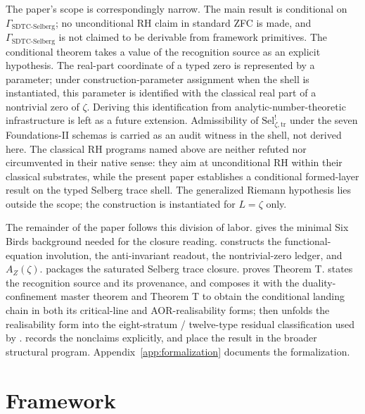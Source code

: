 \documentclass[11pt]{article}
\newcommand{\AZ}{A_{Z}(\zeta)}
\newcommand{\Sel}{\mathrm{Sel}^{!}_{\zeta,\mathrm{tr}}}
\newcommand{\GamSDTCSelberg}{\Gamma_{\mathrm{SDTC\text{-}Selberg}}}
\theoremstyle{definition}
\begin{document}
The paper's scope is correspondingly narrow.  The main result is
conditional on \(\GamSDTCSelberg\); no unconditional RH claim in standard
ZFC is made, and \(\GamSDTCSelberg\) is not claimed to be derivable
from framework primitives.  The conditional theorem takes a value of
the recognition source as an explicit hypothesis.  The
real-part coordinate of a typed zero is represented by a parameter;
under construction-parameter assignment when the shell is
instantiated, this parameter is identified with the classical real
part of a nontrivial zero of \(\zeta\).  Deriving this identification
from analytic-number-theoretic infrastructure is left as a future extension.
Admissibility of \(\Sel\) under the seven Foundations-II schemas is
carried as an audit witness in the shell, not derived here.  The
classical RH programs named above are neither refuted nor
circumvented in their native sense: they aim at unconditional RH
within their classical substrates, while the present paper
establishes a conditional formed-layer result on the typed Selberg
trace shell.  The generalized Riemann hypothesis lies outside the
scope; the construction is instantiated for \(L=\zeta\) only.

The remainder of the paper follows this division of labor.
 gives the minimal Six Birds background needed for
the closure reading.   constructs the
functional-equation involution, the anti-invariant readout, the
nontrivial-zero ledger, and \(\AZ\).  
packages the saturated Selberg trace closure.  
proves Theorem T.   states the recognition
source and its provenance, and  composes it
with the duality-confinement master theorem and Theorem T to obtain the
conditional landing chain in both its critical-line and
AOR-realisability forms;  then unfolds the
realisability form into the eight-stratum / twelve-type residual
classification used by \citet{TsiokosAOR2026}.
 records the nonclaims explicitly, and
 place the result in the broader
structural program.  Appendix~\ref{app:formalization} documents the formalization.
 

\section{Framework}
\label{sec:framework}
\end{document}
